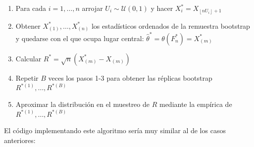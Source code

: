 \documentclass[]{book}
\theoremstyle{definition}
\theoremstyle{definition}
\theoremstyle{definition}
\theoremstyle{remark}
\begin{document}
\begin{enumerate}
\def\labelenumi{\arabic{enumi}.}
\item
  Para cada \(i=1,\ldots ,n\) arrojar
  \(U_i\sim \mathcal{U}\left( 0,1 \right)\) y hacer
  \(X_i^{\ast}=X_{\left\lfloor nU_i\right\rfloor +1}\)
\item
  Obtener \(X_{(1)}^{\ast},\ldots ,X_{(n)}^{\ast}\) los estadísticos
  ordenados de la remuestra bootstrap y quedarse con el que ocupa lugar
  central:
  \(\hat{\theta}^{\ast}=\theta \left( F_n^{\ast} \right) =X_{(m)}^{\ast}\)
\item
  Calcular
  \(R^{\ast}=\sqrt{n}\left( X_{(m)}^{\ast}-X_{\left(m \right)} \right)\)
\item
  Repetir \(B\) veces los pasos 1-3 para obtener las réplicas bootstrap
  \(R^{\ast (1)}, \ldots, R^{\ast (B)}\)
\item
  Aproximar la distribución en el muestreo de \(R\) mediante la empírica
  de \(R^{\ast (1)}, \ldots, R^{\ast (B)}\)
\end{enumerate}

El código implementando este algoritmo sería muy similar al de los casos
anteriores:
\end{document}

